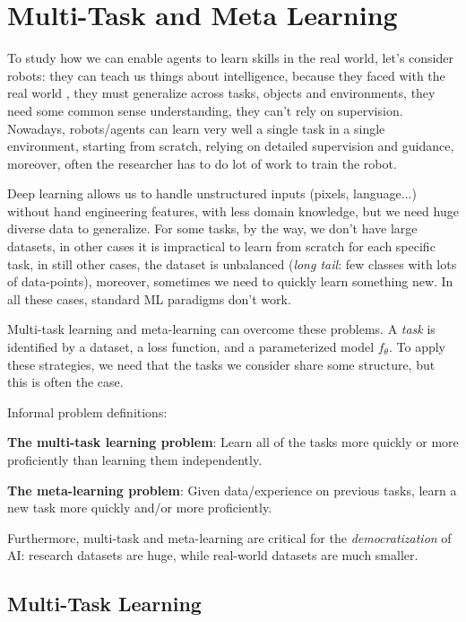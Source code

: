 \section{Multi-Task and Meta Learning}\label{sec:multi-meta}

To study how we can enable agents to learn skills in the real world, let's consider robots: they can teach us things about intelligence, because they faced with the real world , they must generalize across tasks, objects and environments, they need some common sense understanding, they can't rely on supervision. Nowadays, robots/agents can learn very well a single task in a single environment, starting from scratch, relying on detailed supervision and guidance, moreover, often the researcher has to do lot of work to train the robot.

Deep learning allows us to handle unstructured inputs (pixels, language...) without hand engineering features, with less domain knowledge, but we need huge diverse data to generalize. For some tasks, by the way, we don't have large datasets, in other cases it is impractical to learn from scratch for each specific task, in still other cases, the dataset is unbalanced (\textit{long tail}: few classes with lots of data-points), moreover, sometimes we need to quickly learn something new. In all these cases, standard ML paradigms don't work.

Multi-task learning and meta-learning can overcome these problems. A \textit{task} is identified by a dataset, a loss function, and a parameterized model $f_\theta$. To apply these strategies, we need that the tasks we consider share some structure, but this is often the case.

Informal problem definitions:
\begin{myitem}
    \item \textbf{The multi-task learning problem}: Learn all of the tasks more quickly or more proficiently than learning them independently.
    \item \textbf{The meta-learning problem}: Given data/experience on previous tasks, learn a new task more quickly and/or more proficiently.
\end{myitem}

Furthermore, multi-task and meta-learning are critical for the \textit{democratization} of AI: research datasets are huge, while real-world datasets are much smaller.


\subsection{Multi-Task Learning}\label{sec:mm-multi}

